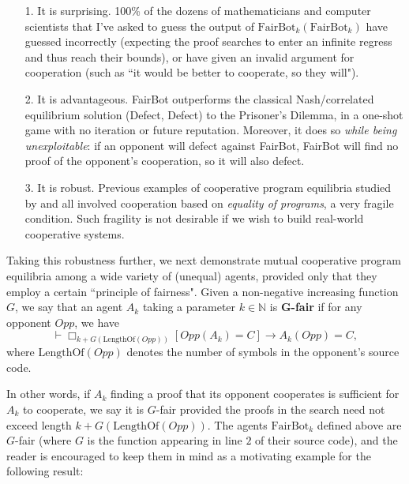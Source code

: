 \documentclass[onecolumn]{miri-tech-article}
\numberwithin{equation}{section}
\theoremstyle{definition}
\newcommand{\NN}{\mathbb{N}}
\newcommand{\proves}[1]{\underset{#1}{\vdash}}
\newcommand{\bx}[1]{\Box_{#1}}
\renewcommand{\implies}{\rightarrow}
\renewcommand{\-}{^{-1}}
\newcommand{\FB}{\mathrm{FairBot}}
\begin{document}
\begin{itemize}
\item[1.]  It is surprising.  100\% of the dozens of mathematicians and computer scientists that I've asked to guess the output of $\FB_k(\FB_k)$ have guessed incorrectly (expecting the proof searches to enter an infinite regress and thus reach their bounds), or have given an invalid argument for cooperation (such as ``it would be better to cooperate, so they will").
\item[2.] It is advantageous. FairBot outperforms the classical Nash/correlated equilibrium solution (Defect, Defect) to the Prisoner's Dilemma, in a one-shot game with no iteration or future reputation.  Moreover, it does so {\em while being unexploitable}: if an opponent will defect against FairBot, FairBot will find no proof of the opponent's cooperation, so it will also defect.  
\item[3.] It is robust.  Previous examples of cooperative program equilibria studied by \cite{Tennenholtz:2004:Program} and \cite{Fortnow:2009:Program} all involved cooperation based on {\em equality of programs}, a very fragile condition.  Such fragility is not desirable if we wish to build real-world cooperative systems.  
\end{itemize}

Taking this robustness further, we next demonstrate mutual cooperative program equilibria among a wide variety of (unequal) agents, provided only that they employ a certain ``principle of fairness".  Given a non-negative increasing function $G$, we say that an agent $A_k$ taking a parameter $k \in \NN$ is {\bf G-fair} if for any opponent $Opp$, we have
$$\proves{} \bx{k+G(\textrm{LengthOf}(Opp))}[Opp(A_k) = C] \implies A_k(Opp) = C,$$
where $\textrm{LengthOf}(Opp)$ denotes the number of symbols in the opponent's source code.

In other words, if $A_k$ finding a proof that its opponent cooperates is sufficient for $A_k$ to cooperate, we say it is $G$-fair provided the proofs in the search need not exceed length $k+G(\textrm{LengthOf}(Opp))$.  The agents $\FB_k$ defined above are $G$-fair (where $G$ is the function appearing in line $2$ of their source code), and the reader is encouraged to keep them in mind as a motivating example for the following result:
\end{document}
